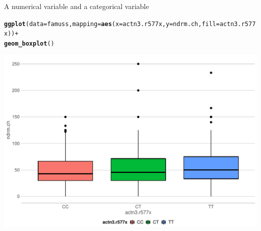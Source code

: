 \documentclass[10pt]{beamer}\usepackage[]{graphicx}\usepackage[]{color}
\makeatletter
\def\maxwidth{ %
  \ifdim\Gin@nat@width>\linewidth
    \linewidth
  \else
    \Gin@nat@width
  \fi
}
\newcommand{\hlopt}[1]{\textcolor[rgb]{0,0,0}{#1}}%
\newcommand{\hlstd}[1]{\textcolor[rgb]{0.345,0.345,0.345}{#1}}%
\newcommand{\hlkwc}[1]{\textcolor[rgb]{0.333,0.667,0.333}{#1}}%
\newcommand{\hlkwd}[1]{\textcolor[rgb]{0.737,0.353,0.396}{\textbf{#1}}}%
\newenvironment{kframe}{%
 \def\at@end@of@kframe{}%
 \ifinner\ifhmode%
  \def\at@end@of@kframe{\end{minipage}}%
  \begin{minipage}{\columnwidth}%
 \fi\fi%
 \def\FrameCommand##1{\hskip\@totalleftmargin \hskip-\fboxsep
 \colorbox{shadecolor}{##1}\hskip-\fboxsep
     \hskip-\linewidth \hskip-\@totalleftmargin \hskip\columnwidth}%
 \MakeFramed {\advance\hsize-\width
   \@totalleftmargin\z@ \linewidth\hsize
   \@setminipage}}%
 {\par\unskip\endMakeFramed%
 \at@end@of@kframe}
\newenvironment{knitrout}{}{} %
\makeatother
\begin{document}
\begin{frame}[fragile]{A numerical variable and a categorical variable}
	\protect\hypertarget{a-numerical-variable-and-a-categorical-variable-1}{}
	
	\scriptsize
	
	\scriptsize
	

	
\begin{knitrout}\scriptsize
{}\color{fgcolor}\begin{kframe}
\begin{alltt}
\hlkwd{ggplot}\hlstd{(}\hlkwc{data} \hlstd{= famuss,} \hlkwc{mapping} \hlstd{=} \hlkwd{aes}\hlstd{(}\hlkwc{x} \hlstd{= actn3.r577x,} \hlkwc{y} \hlstd{= ndrm.ch,} \hlkwc{fill} \hlstd{= actn3.r577x))} \hlopt{+}
  \hlkwd{geom_boxplot}\hlstd{()}
\end{alltt}
\end{kframe}

{\centering \includegraphics[width=\maxwidth]{figure/box-1-1} 

}


\end{knitrout}
	
	
	\normalsize
	
\end{frame}
\end{document}
